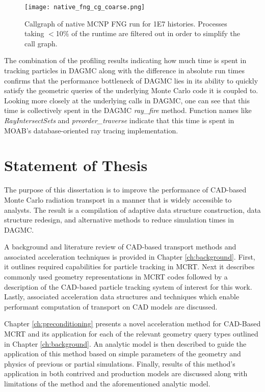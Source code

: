 \begin{figure}[H]
  \centering
  \caption{Callgraph of native MCNP FNG run for \num{1E7} histories. Processes taking
    $<$10\% of the runtime are filtered out in order to simplify the call
    graph.}
  \label{mcnp-fng-coarse}
  \texttt{[image: native\_fng\_cg\_coarse.png]}
\end{figure}

The combination of the profiling results indicating how much time is spent in
tracking particles in DAGMC along with the difference in absolute run times
confirms that the performance bottleneck of DAGMC lies in its ability to quickly
satisfy the geometric queries of the underlying Monte Carlo code it is coupled
to. Looking more closely at the underlying calls in DAGMC, one can see that this
time is collectively spent in the DAGMC \textit{ray\_fire} method. Function names
like \textit{RayIntersectSets} and \textit{preorder\_traverse} indicate that
this time is spent in MOAB's database-oriented ray tracing implementation.

\section{Statement of Thesis}

The purpose of this dissertation is to improve the performance of CAD-based
Monte Carlo radiation transport in a manner that is widely accessible to
analysts. The result is a compilation of adaptive data structure construction,
data structure redesign, and alternative methods to reduce simulation times in
DAGMC.

A background and literature review of CAD-based transport methods and associated
acceleration techniques is provided in Chapter \ref{ch:background}. First, it
outlines required capabilities for particle tracking in MCRT. Next it describes
commonly used geometry representations in MCRT codes followed by a description
of the CAD-based particle tracking system of interest for this work. Lastly,
associated acceleration data structures and techniques which enable performant
computation of transport on CAD models are discussed.

Chapter \ref{ch:preconditioning} presents a novel acceleration method for
CAD-Based MCRT and its application for each of the relevant geometry query types
outlined in Chapter \ref{ch:background}. An analytic model is then described to
guide the application of this method based on simple parameters of the geometry
and physics of previous or partial simulations. Finally, results of this
method's application in both contrived and production models are discussed along
with limitations of the method and the aforementioned analytic model.

